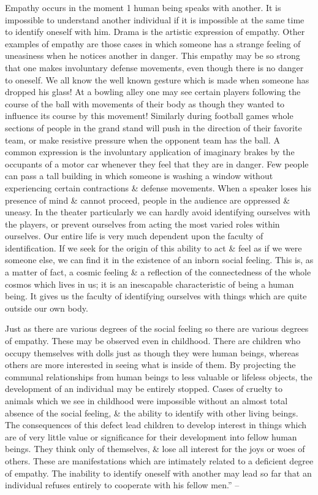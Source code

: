 \documentclass{article}
\begin{document}
Empathy occurs in the moment 1 human being speaks with another. It is impossible to understand another individual if it is impossible at the same time to identify oneself with him. Drama is the artistic expression of empathy. Other examples of empathy are those cases in which someone has a strange feeling of uneasiness when he notices another in danger. This empathy may be so strong that one makes involuntary defense movements, even though there is no danger to oneself. We all know the well known gesture which is made when someone has dropped his glass! At a bowling alley one may see certain players following the course of the ball with movements of their body as though they wanted to influence its course by this movement! Similarly during football games whole sections of people in the grand stand will push in the direction of their favorite team, or make resistive pressure when the opponent team has the ball. A common expression is the involuntary application of imaginary brakes by the occupants of a motor car whenever they feel that they are in danger. Few people can pass a tall building in which someone is washing a window without experiencing certain contractions \& defense movements. When a speaker loses his presence of mind \& cannot proceed, people in the audience are oppressed \& uneasy. In the theater particularly we can hardly avoid identifying ourselves with the players, or prevent ourselves from acting the most varied roles within ourselves. Our entire life is very much dependent upon the faculty of identification. If we seek for the origin of this ability to act \& feel as if we were someone else, we can find it in the existence of an inborn social feeling. This is, as a matter of fact, a cosmic feeling \& a reflection of the connectedness of the whole cosmos which lives in us; it is an inescapable characteristic of being a human being. It gives us the faculty of identifying ourselves with things which are quite outside our own body.

Just as there are various degrees of the social feeling so there are various degrees of empathy. These may be observed even in childhood. There are children who occupy themselves with dolls just as though they were human beings, whereas others are more interested in seeing what is inside of them. By projecting the communal relationships from human beings to less valuable or lifeless objects, the development of an individual may be entirely stopped. Cases of cruelty to animals which we see in childhood were impossible without an almost total absence of the social feeling, \& the ability to identify with other living beings. The consequences of this defect lead children to develop interest in things which are of very little value or significance for their development into fellow human beings. They think only of themselves, \& lose all interest for the joys or woes of others. These are manifestations which are intimately related to a deficient degree of empathy. The inability to identify oneself with another may lead so far that an individual refuses entirely to cooperate with his fellow men.'' -- \cite[pp. 60--62]{Adler_human_nature}
\end{document}
